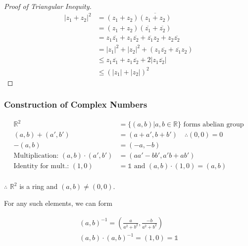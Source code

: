 \documentclass{article}
\newcommand{\abs}[1]{\left| #1 \right|}
\begin{document}
    \begin{proof}[Proof of Triangular Inequity]
        \begin{align*}
            \abs{z_{1} + z_{2}}^{2} &= (z_{1} + z_{2}) \overline{(z_{1} + z_{2})} \\
                                               &= (z_{1} + z_{2}) {(\overline{z_{1}} + \overline{z_{2}})} \\
                                               &= z_{1}\overline{z_{1}} + z_{1}\overline{z_{2}} + \overline{z_{1}}z_{2} + z_{2}\overline{z_{2}} \\
                                               &= \abs{z_{1}}^{2} + \abs{z_{2}}^{2} + (z_{1}\overline{z_{2}} + \overline{z_{1}}z_{2}) \\
                                               &\leq z_{1}\overline{z_{1}} + z_{1}\overline{z_{2}} + 2\abs{z_{1}\overline{z_{2}}} \\
                                               &\leq (\abs{z_{1}} + \abs{z_{2}})^{2}
        \end{align*}
    \end{proof}
    
    \subsubsection{Construction of Complex Numbers}
    
    \begin{align*}
        \mathbb{R}^{2} &= \{ (a, b) | a, b \in \mathbb{R} \} \text{ forms abelian group} \\
        (a, b) + (a', b') &= (a + a', b + b') \quad \therefore (0, 0) = 0 \\
        -(a, b) &= (-a, -b) \\
        \text{Multiplication: } (a, b) \cdot (a', b') &= (aa' - bb', a'b + ab') \\
        \text{Identity for mult.: } (1, 0) &= \mathds{1} \text{ and } (a, b) \cdot (1, 0) = (a, b) \\
    \end{align*}
    
    $\therefore$ $\mathbb{R}^{2}$ is a ring and $(a, b) \neq (0, 0)$.
    
    For any such elements, we can form
    
    \begin{align*}
        (a, b)^{-1} = (\frac{a}{a^{2} + b^{2}}, \frac{-b}{a^{2} + b^{2}}) \\
        (a, b) \cdot (a, b)^{-1} = (1, 0) = \mathds{1} \\
    \end{align*}
    
\end{document}
